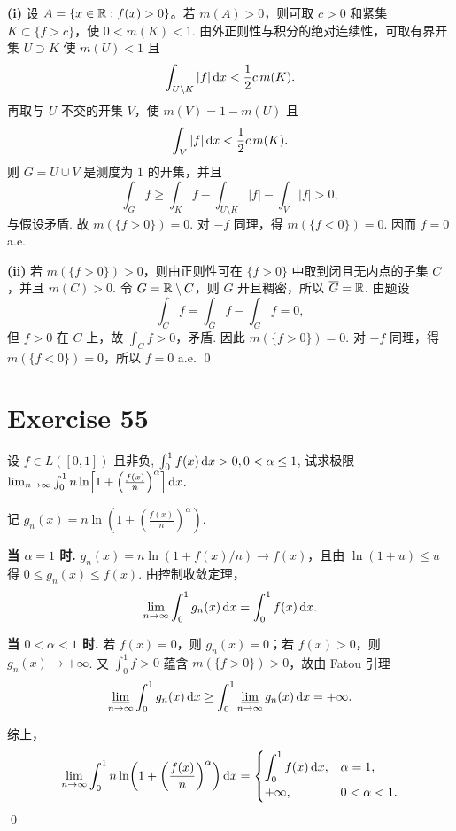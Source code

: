 \documentclass{article}
\begin{document}
\begin{solution}
  \textbf{(i)}\quad
  设 $A = \{x \in \mathbb{R} : f(x) > 0\}$。若 $m(A) > 0$，则可取 $c>0$ 和紧集 $K \subset \{f>c\}$，使 $0<m(K)<1$.
  由外正则性与积分的绝对连续性，可取有界开集 $U \supset K$ 使 $m(U)<1$ 且
  \[
    \int_{U\setminus K} |f|\,\mathrm{d} x < \frac12 c\,m(K).
  \]
  再取与 $U$ 不交的开集 $V$，使 $m(V)=1-m(U)$ 且
  \[
    \int_V |f|\,\mathrm{d} x < \frac12 c\,m(K).
  \]
  则 $G = U \cup V$ 是测度为 $1$ 的开集，并且
  \[
    \int_G f \ge \int_K f - \int_{U\setminus K}|f| - \int_V |f| > 0,
  \]
  与假设矛盾. 故 $m(\{f>0\})=0$. 对 $-f$ 同理，得 $m(\{f<0\})=0$.
  因而 $f=0$ a.e.

  \textbf{(ii)}\quad
  若 $m(\{f>0\}) > 0$，则由正则性可在 $\{f>0\}$ 中取到闭且无内点的子集 $C$，并且 $m(C)>0$.
  令 $G = \mathbb{R} \setminus C$，则 $G$ 开且稠密，所以 $\overline{G} = \mathbb{R}$.
  由题设
  \[
    \int_C f = \int_{\overline{G}} f - \int_G f = 0,
  \]
  但 $f>0$ 在 $C$ 上，故 $\int_C f > 0$，矛盾.
  因此 $m(\{f>0\}) = 0$. 对 $-f$ 同理，得 $m(\{f<0\}) = 0$，所以 $f = 0$ a.e. \qed
\end{solution}

\section{Exercise 55}

设 $f \in L([0, 1])$ 且非负, $\int_0^1 f(x)\,\mathrm{d} x > 0, 0 < \alpha \le 1$, 试求极限 $\lim_{n \to \infty} \int_0^1 n \ln\!\left[1 + \left(\frac{f(x)}{n}\right)^\alpha\right] \mathrm{d} x$.

\begin{solution}
  记 $g_n(x) = n\ln\!\left(1 + \left(\frac{f(x)}{n}\right)^\alpha\right)$.

  \textbf{当 $\alpha = 1$ 时.}\quad
  $g_n(x) = n\ln(1+f(x)/n) \to f(x)$，且由 $\ln(1+u)\le u$ 得 $0\le g_n(x)\le f(x)$.
  由控制收敛定理，
  \[
    \lim_{n\to\infty}\int_0^1 g_n(x)\,\mathrm{d} x = \int_0^1 f(x)\,\mathrm{d} x.
  \]

  \textbf{当 $0<\alpha<1$ 时.}\quad
  若 $f(x)=0$，则 $g_n(x)=0$；若 $f(x)>0$，则 $g_n(x)\to +\infty$.
  又 $\int_0^1 f>0$ 蕴含 $m(\{f>0\})>0$，故由 Fatou 引理
  \[
    \varliminf_{n\to\infty}\int_0^1 g_n(x)\,\mathrm{d} x
    \ge \int_0^1 \varliminf_{n\to\infty} g_n(x)\,\mathrm{d} x
    = +\infty.
  \]

  综上，
  \[
    \lim_{n\to\infty}\int_0^1 n\ln\!\left(1 + \left(\frac{f(x)}{n}\right)^\alpha\right)\mathrm{d} x
    = \begin{cases}
      \displaystyle\int_0^1 f(x)\,\mathrm{d} x, & \alpha = 1, \\[6pt]
      +\infty, & 0<\alpha<1.
    \end{cases}
  \]
  \qed
\end{solution}
\end{document}
